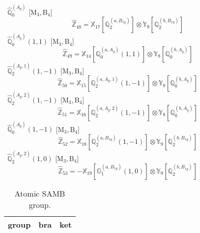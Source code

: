 \documentclass[fleqn,10pt,landscape]{article}
\begin{document}
\begin{itemize}
\begin{dmath*}
\end{dmath*}
\vspace{4mm}
\noindent {} $\,\,\,\hat{\mathbb{Q}}_{0}^{(A_{g})}$ [M$_{3}$,\,B$_{4}$]
\begin{dmath*}
\hat{\mathbb{Z}}_{48}=\mathbb{X}_{17}[\mathbb{Q}_{2}^{(a,B_{1g})}] \otimes\mathbb{Y}_{9}[\mathbb{Q}_{2}^{(b,B_{1g})}]
\end{dmath*}
\vspace{4mm}
\noindent {} $\,\,\,\hat{\mathbb{Q}}_{0}^{(A_{g})}(1,1)$ [M$_{3}$,\,B$_{4}$]
\begin{dmath*}
\hat{\mathbb{Z}}_{49}=\mathbb{X}_{14}[\mathbb{Q}_{0}^{(a,A_{g})}(1,1)] \otimes\mathbb{Y}_{8}[\mathbb{Q}_{0}^{(b,A_{g})}]
\end{dmath*}
\vspace{4mm}
\noindent {} $\,\,\,\hat{\mathbb{Q}}_{2}^{(A_{g},1)}(1,-1)$ [M$_{3}$,\,B$_{4}$]
\begin{dmath*}
\hat{\mathbb{Z}}_{50}=\mathbb{X}_{15}[\mathbb{Q}_{2}^{(a,A_{g},1)}(1,-1)] \otimes\mathbb{Y}_{8}[\mathbb{Q}_{0}^{(b,A_{g})}]
\end{dmath*}
\vspace{4mm}
\noindent {} $\,\,\,\hat{\mathbb{Q}}_{2}^{(A_{g},2)}(1,-1)$ [M$_{3}$,\,B$_{4}$]
\begin{dmath*}
\hat{\mathbb{Z}}_{51}=\mathbb{X}_{16}[\mathbb{Q}_{2}^{(a,A_{g},2)}(1,-1)] \otimes\mathbb{Y}_{8}[\mathbb{Q}_{0}^{(b,A_{g})}]
\end{dmath*}
\vspace{4mm}
\noindent {} $\,\,\,\hat{\mathbb{Q}}_{0}^{(A_{g})}(1,-1)$ [M$_{3}$,\,B$_{4}$]
\begin{dmath*}
\hat{\mathbb{Z}}_{52}=\mathbb{X}_{18}[\mathbb{Q}_{2}^{(a,B_{1g})}(1,-1)] \otimes\mathbb{Y}_{9}[\mathbb{Q}_{2}^{(b,B_{1g})}]
\end{dmath*}
\vspace{4mm}
\noindent {} $\,\,\,\hat{\mathbb{Q}}_{2}^{(A_{g},2)}(1,0)$ [M$_{3}$,\,B$_{4}$]
\begin{dmath*}
\hat{\mathbb{Z}}_{53}=- \mathbb{X}_{19}[\mathbb{G}_{1}^{(a,B_{1g})}(1,0)] \otimes\mathbb{Y}_{9}[\mathbb{Q}_{2}^{(b,B_{1g})}]
\end{dmath*}
\begin{center}
\renewcommand{\arraystretch}{1.3}
\begin{longtable}{c|c|c}
\caption{Atomic SAMB group.}
 \\
 \hline \hline
group & bra & ket \\ \hline \endfirsthead


\end{longtable}
\end{center}
\end{itemize}
\end{document}
